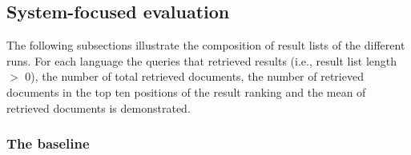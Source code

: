 \documentclass[a4paper,11pt]{article}
\begin{document}
\begin{table}[ht]
\caption{Overview of systems, runs and retrieved documents that need to be rated, excluding duplicates. MT = machine translated queries, HT = human translated (i.e., original) queries.}
\label{tab:Runs}
\end{table}


\subsection{System-focused evaluation}
The following subsections illustrate the composition of result lists of the different runs. For each language the queries that retrieved results (i.e., result list length $>$ 0), the number of total retrieved documents, the number of retrieved documents in the top ten positions of the result ranking and the mean of retrieved documents is demonstrated.

\subsubsection{The baseline}
\end{document}
